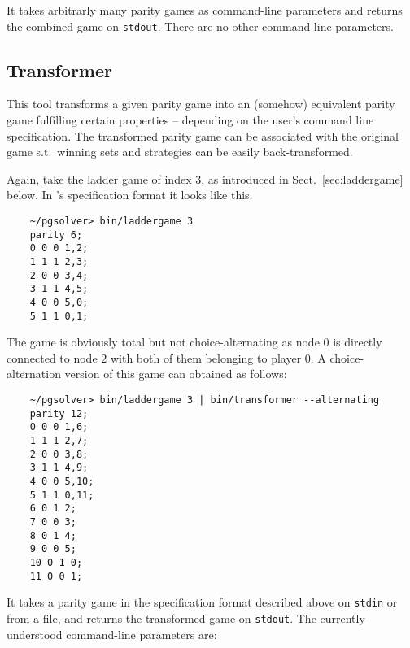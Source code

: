 It takes arbitrarly many parity games as command-line parameters and returns the
combined game on \texttt{stdout}. There are no other command-line parameters.


\subsection{Transformer}

This tool transforms a given parity game into an (somehow) equivalent parity game fulfilling
certain properties -- depending on the user's command line specification. The transformed
parity game can be associated with the original game s.t.\ winning sets and strategies can
be easily back-transformed.


\begin{example}
Again, take the ladder game of index 3, as introduced in Sect.~\ref{sec:laddergame} below.
In \pgsolver's specification format it looks like this.
\begin{verbatim}
    ~/pgsolver> bin/laddergame 3
    parity 6;
    0 0 0 1,2;
    1 1 1 2,3;
    2 0 0 3,4;
    3 1 1 4,5;
    4 0 0 5,0;
    5 1 1 0,1;
\end{verbatim}
The game is obviously total but not choice-alternating as node $0$ is directly connected to node $2$
with both of them belonging to player $0$. A choice-alternation version of this game can obtained as follows:
\begin{verbatim}
    ~/pgsolver> bin/laddergame 3 | bin/transformer --alternating
    parity 12;
    0 0 0 1,6;
    1 1 1 2,7;
    2 0 0 3,8;
    3 1 1 4,9;
    4 0 0 5,10;
    5 1 1 0,11;
    6 0 1 2;
    7 0 0 3;
    8 0 1 4;
    9 0 0 5;
    10 0 1 0;
    11 0 0 1;
\end{verbatim}
\end{example}

It takes a parity game in the specification format described above on \texttt{stdin} or from a file,
and returns the transformed game on \texttt{stdout}. The currently understood command-line parameters are:


